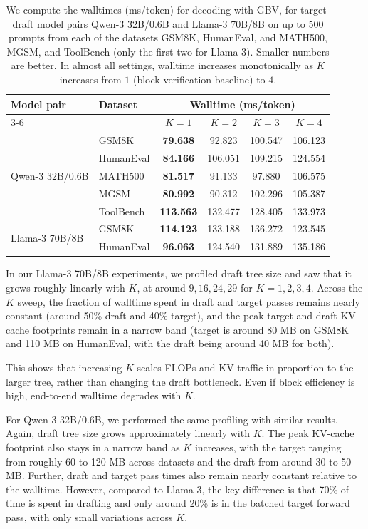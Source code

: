 \documentclass{article}
\theoremstyle{plain}
\theoremstyle{definition}
\theoremstyle{remark}
\begin{document}
\begin{table}[htbp]
\centering
\begin{tabular}{@{}llcccc@{}}
\toprule
\textbf{Model pair} & \textbf{Dataset} & \multicolumn{4}{c}{\textbf{Walltime} (ms/token)} \\
\cmidrule(lr){3-6}
& & \textbf{$K=1$} & \textbf{$K=2$} & \textbf{$K=3$} & \textbf{$K=4$} \\
\midrule
\multirow{5}{*}{Qwen-3 32B/0.6B}
& GSM8K      & \textbf{79.638}  & 92.823  & 100.547 & 106.123 \\
& HumanEval  & \textbf{84.166}  & 106.051 & 109.215 & 124.554 \\
& MATH500    & \textbf{81.517}  & 91.133  & 97.880  & 106.575 \\
& MGSM       & \textbf{80.992}  & 90.312  & 102.296 & 105.387 \\
& ToolBench  & \textbf{113.563} & 132.477 & 128.405 & 133.973 \\
\midrule
\multirow{2}{*}{Llama-3 70B/8B}
& GSM8K      & \textbf{114.123} & 133.188 & 136.272 & 123.545 \\
& HumanEval  & \textbf{96.063} & 124.540 & 131.889 & 135.186 \\
\bottomrule
\end{tabular}
\caption{We compute the walltimes (ms/token) for decoding with GBV, for target-draft model pairs Qwen-3 32B/0.6B and Llama-3 70B/8B on up to 500 prompts from each of the datasets GSM8K, HumanEval, and MATH500, MGSM, and ToolBench (only the first two for Llama-3). Smaller numbers are better. In almost all settings, walltime increases monotonically as $K$ increases from $1$ (block verification baseline) to $4$.}
\label{tab:qwen-walltime}
\end{table}

In our Llama-3 70B/8B experiments, we profiled draft tree size and saw that it grows roughly linearly with $K$, at around $9,16,24,29$ for $K=1,2,3,4$. Across the $K$ sweep, the fraction of walltime spent in draft and target passes remains nearly constant (around 50\% draft and 40\% target), and the peak target and draft KV-cache footprints remain in a narrow band (target is around 80 MB on GSM8K and 110 MB on HumanEval, with the draft being around 40 MB for both). 

This shows that increasing $K$ scales FLOPs and KV traffic in proportion to the larger tree, rather than changing the draft bottleneck. Even if block efficiency is high, end-to-end walltime degrades with $K$. 

For Qwen-3 32B/0.6B, we performed the same profiling with similar results. Again, draft tree size grows approximately linearly with $K$. The peak KV-cache footprint also stays in a narrow band as $K$ increases, with the target ranging from roughly 60 to 120 MB across datasets and the draft from around 30 to 50 MB. Further, draft and target pass times also remain nearly constant relative to the walltime. However, compared to Llama-3, the key difference is that 70\% of time is spent in drafting and only around 20\% is in the batched target forward pass, with only small variations across $K$. 
\end{document}
